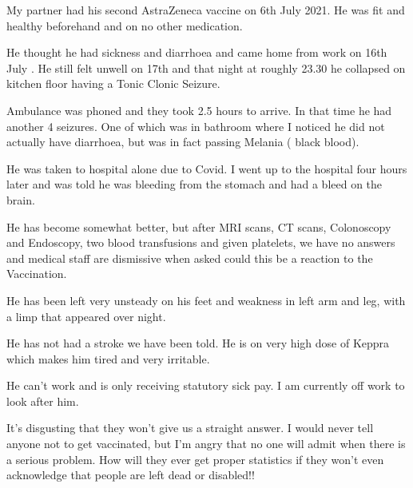 My partner had his second AstraZeneca vaccine on 6th July 2021. He was fit and
healthy beforehand and on no other medication.

He thought he had sickness and diarrhoea and came home from work on 16th July
. He still felt unwell on 17th and that night at roughly 23.30 he collapsed on
kitchen floor having a Tonic Clonic Seizure.

Ambulance was phoned and they took 2.5 hours to arrive. In that time he had
another 4 seizures. One of which was in bathroom where I noticed he did not
actually have diarrhoea, but was in fact passing Melania ( black blood).

He was taken to hospital alone due to Covid. I went up to the hospital four
hours later and was told he was bleeding from the stomach and had a bleed on the
brain.

He has become somewhat better, but after MRI scans, CT scans, Colonoscopy and
Endoscopy, two blood transfusions and given platelets, we have no answers and
medical staff are dismissive when asked could this be a reaction to the
Vaccination.

He has been left very unsteady on his feet and weakness in left arm and leg,
with a limp that appeared over night.

He has not had a stroke we have been told. He is on very high dose of Keppra
which makes him tired and very irritable.

He can’t work and is only receiving statutory sick pay. I am currently off work
to look after him.

It’s disgusting that they won’t give us a straight answer. I would never tell
anyone not to get vaccinated, but I’m angry that no one will admit when there is
a serious problem. How will they ever get proper statistics if they won’t even
acknowledge that people are left dead or disabled!!

